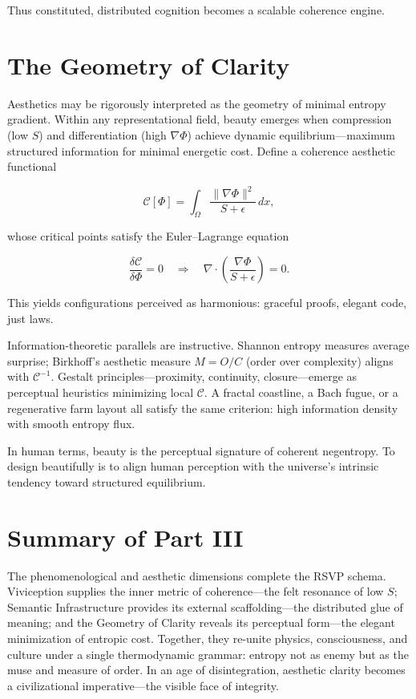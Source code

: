 \documentclass[12pt,a4paper]{article}
\begin{document}
Thus constituted, distributed cognition becomes a scalable coherence engine.

\section{The Geometry of Clarity}

Aesthetics may be rigorously interpreted as the geometry of minimal entropy gradient. Within any representational field, beauty emerges when compression (low $S$) and differentiation (high $\nabla \Phi$) achieve dynamic equilibrium—maximum structured information for minimal energetic cost. Define a coherence aesthetic functional

\begin{equation}
\mathcal{C}[\Phi] = \int_\Omega \frac{\|\nabla \Phi\|^2}{S + \epsilon} \, dx,
\end{equation}

whose critical points satisfy the Euler–Lagrange equation

\begin{equation}
\frac{\delta \mathcal{C}}{\delta \Phi} = 0 \quad \Rightarrow \quad
\nabla \cdot \left( \frac{\nabla \Phi}{S + \epsilon} \right) = 0.
\end{equation}

This yields configurations perceived as harmonious: graceful proofs, elegant code, just laws.

Information-theoretic parallels are instructive. Shannon entropy measures average surprise; Birkhoff’s aesthetic measure $M = O/C$ (order over complexity) aligns with $\mathcal{C}^{-1}$. Gestalt principles—proximity, continuity, closure—emerge as perceptual heuristics minimizing local $\mathcal{C}$. A fractal coastline, a Bach fugue, or a regenerative farm layout all satisfy the same criterion: high information density with smooth entropy flux.

In human terms, beauty is the perceptual signature of coherent negentropy. To design beautifully is to align human perception with the universe’s intrinsic tendency toward structured equilibrium.

\section*{Summary of Part III}

The phenomenological and aesthetic dimensions complete the RSVP schema. Viviception supplies the inner metric of coherence—the felt resonance of low $S$; Semantic Infrastructure provides its external scaffolding—the distributed glue of meaning; and the Geometry of Clarity reveals its perceptual form—the elegant minimization of entropic cost. Together, they re-unite physics, consciousness, and culture under a single thermodynamic grammar: entropy not as enemy but as the muse and measure of order. In an age of disintegration, aesthetic clarity becomes a civilizational imperative—the visible face of integrity.
\end{document}
